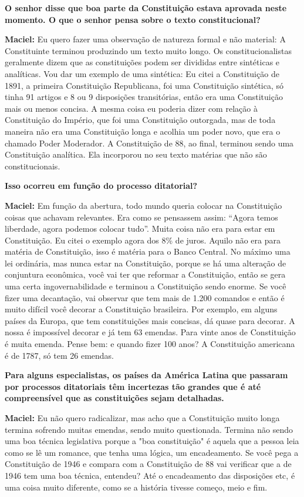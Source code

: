 \textbf{O senhor disse que boa parte da Constituição estava aprovada
neste momento. O que o senhor pensa sobre o texto constitucional?}

\textbf{Maciel:} Eu quero fazer uma observação de natureza formal e não
material: A Constituinte terminou produzindo um texto muito longo. Os
constitucionalistas geralmente dizem que as constituições podem ser
divididas entre sintéticas e analíticas. Vou dar um exemplo de uma
sintética: Eu citei a Constituição de 1891, a primeira Constituição
Republicana, foi uma Constituição sintética, só tinha 91 artigos e 8 ou
9 disposições transitórias, então era uma Constituição mais ou menos
concisa. A mesma coisa eu poderia dizer com relação à Constituição do
Império, que foi uma Constituição outorgada, mas de toda maneira não era
uma Constituição longa e acolhia um poder novo, que era o chamado Poder
Moderador. A Constituição de 88, ao final, terminou sendo uma
Constituição analítica. Ela incorporou no seu texto matérias que não são
constitucionais.

\textbf{Isso ocorreu em função do processo ditatorial?}

\textbf{Maciel:} Em função da abertura, todo mundo queria colocar na
Constituição coisas que achavam relevantes. Era como se pensassem assim:
``Agora temos liberdade, agora podemos colocar tudo''. Muita coisa não
era para estar em Constituição. Eu citei o exemplo agora dos 8\% de
juros. Aquilo não era para matéria de Constituição, isso é matéria para
o Banco Central. No máximo uma lei ordinária, mas nunca estar na
Constituição, porque se há uma alteração de conjuntura econômica, você
vai ter que reformar a Constituição, então se gera uma certa
ingovernabilidade e terminou a Constituição sendo enorme. Se você fizer
uma decantação, vai observar que tem mais de 1.200 comandos e então é
muito difícil você decorar a Constituição brasileira. Por exemplo, em
alguns países da Europa, que tem constituições mais concisas, dá quase
para decorar. A nossa é impossível decorar e já tem 63 emendas. Para
vinte anos de Constituição é muita emenda. Pense bem: e quando fizer 100
anos? A Constituição americana é de 1787, só tem 26 emendas.

\textbf{Para alguns especialistas, os países da América Latina que
passaram por processos ditatoriais têm incertezas tão grandes que é até
compreensível que as constituições sejam detalhadas.}

\textbf{Maciel:} Eu não quero radicalizar, mas acho que a Constituição
muito longa termina sofrendo muitas emendas, sendo muito questionada.
Termina não sendo uma boa técnica legislativa porque a "boa
constituição" é aquela que a pessoa leia como se lê um romance, que
tenha uma lógica, um encadeamento. Se você pega a Constituição de 1946 e
compara com a Constituição de 88 vai verificar que a de 1946 tem uma boa
técnica, entendeu? Até o encadeamento das disposições etc, é uma coisa
muito diferente, como se a história tivesse começo, meio e fim.

